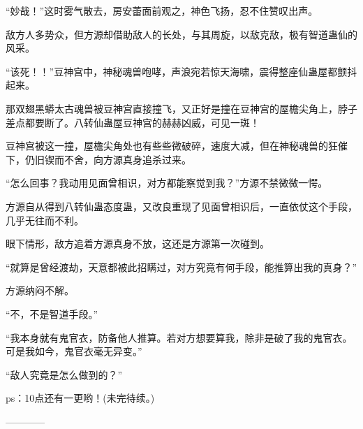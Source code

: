 \begin{this_body}
“妙哉！”这时雾气散去，房安蕾面前观之，神色飞扬，忍不住赞叹出声。

敌方人多势众，但方源却借助敌人的长处，与其周旋，以敌克敌，极有智道蛊仙的风采。

“该死！！”豆神宫中，神秘魂兽咆哮，声浪宛若惊天海啸，震得整座仙蛊屋都颤抖起来。

那双翅黑蟒太古魂兽被豆神宫直接撞飞，又正好是撞在豆神宫的屋檐尖角上，脖子差点都要断了。八转仙蛊屋豆神宫的赫赫凶威，可见一斑！

豆神宫被这一撞，屋檐尖角处也有些些微破碎，速度大减，但在神秘魂兽的狂催下，仍旧锲而不舍，向方源真身追杀过来。

“怎么回事？我动用见面曾相识，对方都能察觉到我？”方源不禁微微一愕。

方源自从得到八转仙蛊态度蛊，又改良重现了见面曾相识后，一直依仗这个手段，几乎无往而不利。

眼下情形，敌方追着方源真身不放，这还是方源第一次碰到。

“就算是曾经渡劫，天意都被此招瞒过，对方究竟有何手段，能推算出我的真身？”

方源纳闷不解。

“不，不是智道手段。”

“我本身就有鬼官衣，防备他人推算。若对方想要算我，除非是破了我的鬼官衣。可是我如今，鬼官衣毫无异变。”

“敌人究竟是怎么做到的？”

ps：10点还有一更哟！(未完待续。)

------------

\end{this_body}

